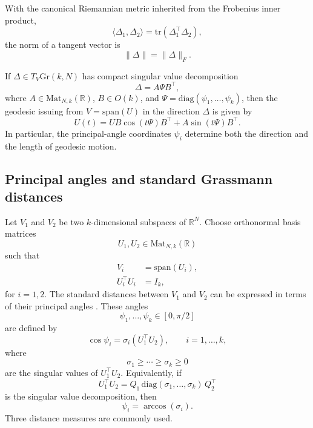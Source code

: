 \documentclass[11pt,letterpaper]{article}
\newcommand{\gr}{\mathrm{Gr}}
\newcommand{\tr}{\mathrm{tr}}
\newcommand{\bR}{\mathbb{R}}
\begin{document}
With the canonical Riemannian metric inherited from the Frobenius inner product,
\begin{equation*}
\langle \Delta_1,\Delta_2\rangle = \tr(\Delta_1^\top \Delta_2),
\end{equation*}
the norm of a tangent vector is
\begin{equation*}
\|\Delta\| = \|\Delta\|_F.
\end{equation*}

If $\Delta\in T_V\gr(k,N)$ has compact singular value decomposition
\begin{equation*}
\Delta = A \Psi B^\top,
\end{equation*}
where $A\in\mathrm{Mat}_{N,k}(\bR)$, $B\in O(k)$, and $\Psi=\mathrm{diag}(\psi_1,\dots,\psi_k)$, then the geodesic issuing from $V=\mathrm{span}(U)$ in the direction $\Delta$ is given by
\begin{equation*}
U(t)= U B \cos(t\Psi) B^\top + A \sin(t\Psi) B^\top.
\end{equation*}
In particular, the principal-angle coordinates $\psi_i$ determine both the direction and the length of geodesic motion.

\subsection{Principal angles and standard Grassmann distances}
\label{sec:grass_dist}

Let $V_1$ and $V_2$ be two $k$-dimensional subspaces of $\bR^N$. Choose orthonormal basis matrices
\begin{equation*}
U_1,U_2\in\mathrm{Mat}_{N,k}(\bR)
\end{equation*}
such that
\begin{equation*}
\begin{split}
V_i&=\mathrm{span}(U_i),\\
U_i^\top U_i&=I_k,
\end{split}
\end{equation*}
for $i=1,2$. The standard distances between $V_1$ and $V_2$ can be expressed in terms of their principal angles \cite{BZA24}. These angles
\begin{equation*}
\psi_1,\ldots,\psi_k\in[0,\pi/2]
\end{equation*}
are defined by
\begin{equation}
\label{eq:principal-angles}
\cos\psi_i = \sigma_i(U_1^\top U_2), \qquad i=1,\ldots,k,
\end{equation}
where
\begin{equation*}
\sigma_1\geq \cdots \geq \sigma_k\geq 0
\end{equation*}
are the singular values of $U_1^\top U_2$. Equivalently, if
\begin{equation}
\label{eq:svd}
U_1^\top U_2 = Q_1\,\mathrm{diag}(\sigma_1,\ldots,\sigma_k)\,Q_2^\top
\end{equation}
is the singular value decomposition, then
\begin{equation*}
\psi_i=\arccos(\sigma_i).
\end{equation*}
Three distance measures are commonly used.
\end{document}
